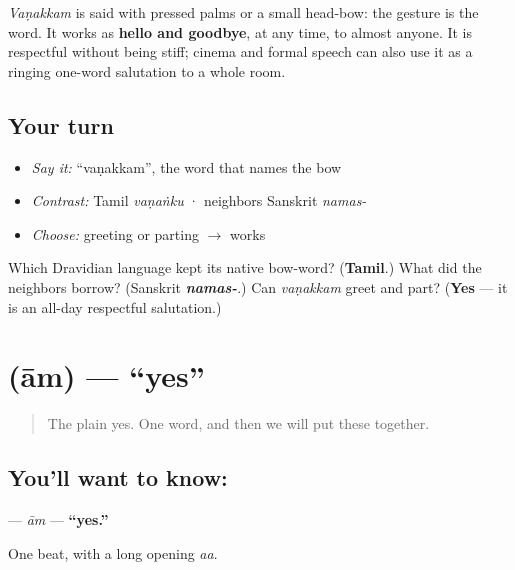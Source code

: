 \begin{culture}
\emph{Vaṇakkam} is said with pressed palms or a small head-bow: the gesture is the word. It works as \textbf{hello and goodbye}, at any time, to almost anyone. It is respectful without being stiff; cinema and formal speech can also use it as a ringing one-word salutation to a whole room.
\end{culture}

\subsection*{Your turn}
\begin{itemize}
\raggedright
  \item \emph{Say it:} \textquotedblleft{}vaṇakkam\textquotedblright{}, the word that names the bow
  \item \emph{Contrast:} Tamil \emph{vaṇaṅku} · neighbors Sanskrit \emph{namas-}
  \item \emph{Choose:} greeting or parting $\to$ \textbf{} works
\end{itemize}

\begin{tcolorbox}[breakable,colback=teal!4,colframe=teal!35!black,title={Before you move on}]
Which Dravidian language kept its native bow-word? (\textbf{Tamil}.) What did the neighbors borrow? (Sanskrit \emph{\textbf{namas-}}.) Can \emph{vaṇakkam} greet and part? (\textbf{Yes} — it is an all-day respectful salutation.)
\end{tcolorbox}
\section[\texorpdfstring{\ta{ஆம்} (ām)}{ஆம் (ām)}]{ (ām) — \textquotedblleft{}yes\textquotedblright{}}

\label{lesson:TA-C01-aam}



\begin{quote}
The plain yes. One word, and then we will put these together.
\end{quote}

\subsection*{You'll want to know: }
\textbf{} — \emph{ām} — \textbf{\textquotedblleft{}yes.\textquotedblright{}}

One beat, with a long opening \emph{aa}.

